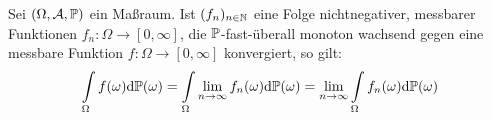 \begin{satz}\label{satzMonotoneKonvergenz}\enter
	Sei $(\Omega,\A,\P)$ ein Maßraum. Ist $(f_n)_{n\in\N}$ eine Folge nichtnegativer, messbarer Funktionen $f_n:\Omega\to[0,\infty]$, 
	die $\P$-fast-überall monoton wachsend gegen eine messbare Funktion $f:\Omega\to[0,\infty]$ konvergiert, so gilt:
	\begin{align*}
		\int\limits_\Omega f(\omega)\d\P(\omega)=\int\limits_\Omega \limn f_n(\omega)\d\P(\omega)
		=\limn\int\limits_\Omega f_n(\omega)\d\P(\omega)
	\end{align*}
\end{satz}



